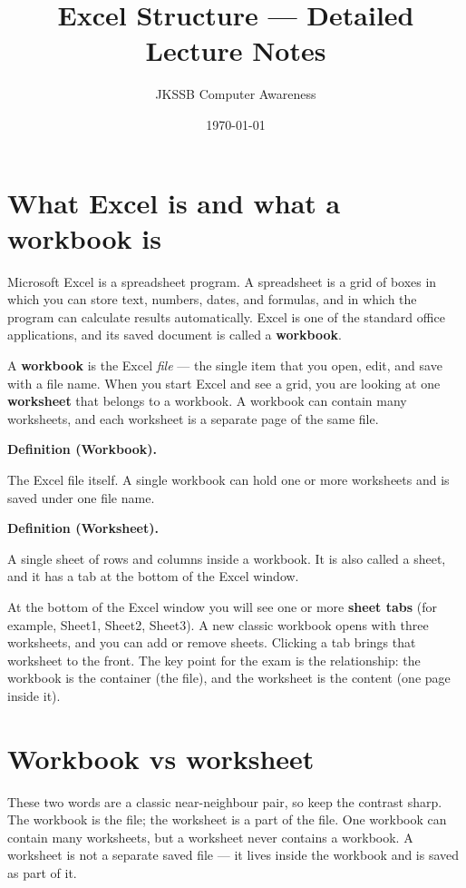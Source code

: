 \documentclass[11pt]{article}
\title{Excel Structure --- Detailed Lecture Notes}
\author{JKSSB Computer Awareness}
\date{\today}
\newenvironment{definitionbox}[1]{%
  \par\noindent\textbf{Definition (#1).}\ \itshape
}{\par\vspace{0.3em}}
\begin{document}
\maketitle

\section{What Excel is and what a workbook is}
Microsoft Excel is a spreadsheet program. A spreadsheet is a grid of boxes
in which you can store text, numbers, dates, and formulas, and in which the
program can calculate results automatically. Excel is one of the standard
office applications, and its saved document is called a \textbf{workbook}.

A \textbf{workbook} is the Excel \emph{file} --- the single item that you
open, edit, and save with a file name. When you start Excel and see a grid,
you are looking at one \textbf{worksheet} that belongs to a workbook. A
workbook can contain many worksheets, and each worksheet is a separate page
of the same file.

\begin{definitionbox}{Workbook}
The Excel file itself. A single workbook can hold one or more worksheets and
is saved under one file name.
\end{definitionbox}

\begin{definitionbox}{Worksheet}
A single sheet of rows and columns inside a workbook. It is also called a
sheet, and it has a tab at the bottom of the Excel window.
\end{definitionbox}

At the bottom of the Excel window you will see one or more \textbf{sheet
tabs} (for example, Sheet1, Sheet2, Sheet3). A new classic workbook opens
with three worksheets, and you can add or remove sheets. Clicking a tab
brings that worksheet to the front. The key point for the exam is the
relationship: the workbook is the container (the file), and the worksheet is
the content (one page inside it).

\section{Workbook vs worksheet}
These two words are a classic near-neighbour pair, so keep the contrast
sharp. The workbook is the file; the worksheet is a part of the file. One
workbook can contain many worksheets, but a worksheet never contains a
workbook. A worksheet is not a separate saved file --- it lives inside the
workbook and is saved as part of it.
\end{document}

